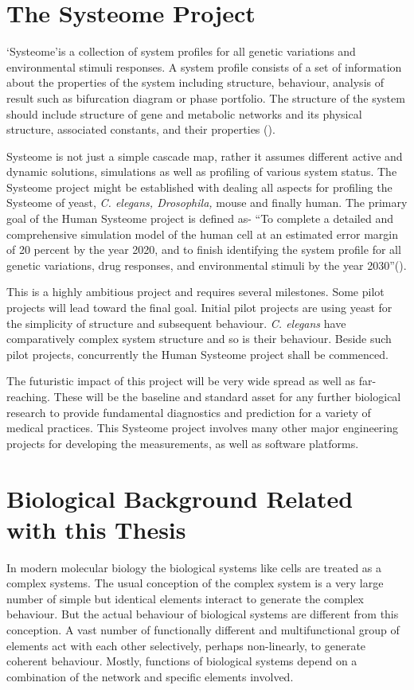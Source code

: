 \section{The Systeome Project}
\lq Systeome\rq is a collection of system profiles for all genetic variations and environmental stimuli responses. A system profile consists of a set of information about the properties of the system including structure, behaviour, analysis of result such as bifurcation diagram or phase portfolio. The structure of the system should include structure of gene and metabolic networks and its physical structure, associated constants, and their properties (\cite{Kitano:2002}).

Systeome is not just a simple cascade map, rather it assumes different active and dynamic solutions, simulations as well as profiling of various system status. The Systeome project might be established with dealing all aspects for profiling the Systeome of yeast, \textit{C. elegans, Drosophila,} mouse and finally human. The primary goal of the Human Systeome project is defined as- ``To complete a detailed and comprehensive simulation model of the human cell at an estimated error margin of 20 percent by the year 2020, and to finish identifying the system profile for all genetic variations, drug responses, and environmental stimuli by the year 2030''(\cite{Kitano:2002}).

This is a highly ambitious project and requires several milestones. Some pilot projects will lead toward the final goal. Initial pilot projects are using yeast for the simplicity of structure and subsequent behaviour. \textit{C. elegans} have comparatively complex system structure and so is their behaviour. Beside such pilot projects, concurrently the Human Systeome project shall be commenced.

The futuristic impact of this project will be very wide spread as well as far-reaching. These will be the baseline and standard asset for any further biological research to provide fundamental diagnostics and prediction for a variety of medical practices. This Systeome project involves many other major engineering projects for developing the measurements, as well as software platforms.

\section{Biological Background Related with this Thesis}
In modern molecular biology the biological systems like cells are treated as a complex systems. The usual conception of the complex system is a very large number of simple but identical elements interact to generate the complex behaviour. But the actual behaviour of biological systems are different from this conception. A vast number of functionally different and multifunctional group of elements act with each other selectively, perhaps non-linearly, to generate coherent behaviour. Mostly, functions of biological systems depend on a combination of the network and specific elements involved. 

